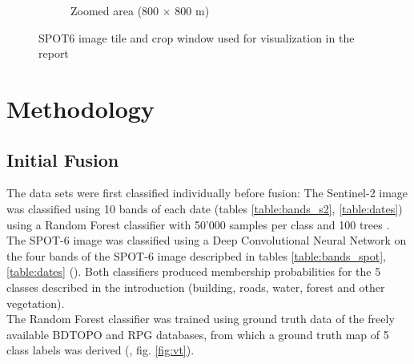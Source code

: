 \documentclass[10pt]{article}
\begin{document}
\begin{figure}[H]
\begin{subfigure}{0.49\textwidth}
        \caption{Zoomed area (800 $\times$ 800 m)}
        \label{fig:areaSmall}
    \end{subfigure}
    \caption{SPOT6 image tile and crop window used for visualization in the report}
    \label{fig:area}
    \centering
\end{figure}

\section{Methodology}\label{sec:method}
\subsection{Initial Fusion}

The data sets were first classified individually before fusion: The Sentinel-2 image was classified using 10 bands of each date (tables \ref{table:bands_s2}, \ref{table:dates}) using a Random Forest classifier with 50'000 samples per class and 100 trees \parencite{Breiman2001}. The SPOT-6 image was classified using a Deep Convolutional Neural Network on the four bands of the SPOT-6 image descripbed in tables \ref{table:bands_spot}, \ref{table:dates} (\cite{postadjian_investigating_2017}). Both classifiers produced membership probabilities for the 5 classes described in the introduction (building, roads, water, forest and other vegetation).\\

The Random Forest classifier was trained using ground truth data of the freely available BDTOPO and RPG databases, from which a ground truth map of 5 class labels was derived (\cite{bdtopo,RPG}, fig. \ref{fig:vt}).
\end{document}
